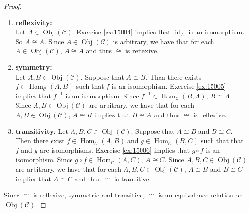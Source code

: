 \documentclass[12pt]{amsart}
\theoremstyle{definition}
\newcommand{\MC}{\mathcal{C}}
\DeclareMathOperator{\id}{id}
\DeclareMathOperator{\Obj}{Obj}
\DeclareMathOperator{\Hom}{Hom}
\DeclareMathOperator*{\0}{\mbf{0}}
\DeclareMathOperator*{\1}{\mbf{1}}
\newcommand{\rex}[1]{Exercise \ref{ex:#1}}
\begin{document}
	\begin{proof} \
		\begin{enumerate}
			\item \textbf{reflexivity: } \\
			Let $A \in \Obj(\MC)$. \rex{15004} implies that $\id_A$ is an isomorphism. So $A \cong A$. Since $A \in \Obj(\MC)$ is arbitrary, we have that for each $A \in \Obj(\MC)$, $A \cong A$ and thus $\cong$ is reflexive. 
			\item \textbf{symmetry: } \\
			Let $A, B \in \Obj(\MC)$. Suppose that $A \cong B$. Then there exists $f \in \Hom_{\MC}(A,B)$ such that $f$ is an isomorphism. \rex{15005} implies that $f^{-1}$ is an isomorphism. Since $f^{-1} \in \Hom_{\MC}(B, A)$, $B \cong A$.  Since $A, B \in \Obj(\MC)$ are arbitrary, we have that for each $A, B \in \Obj(\MC)$, $A \cong B$ implies that $B \cong A$ and thus $\cong$ is reflexive. 
			\item \textbf{transitivity: }
			Let $A, B, C \in \Obj(\MC)$. Suppose that $A \cong B$ and $B \cong C$. Then there exist $f \in \Hom_{\MC}(A,B)$ and $g \in \Hom_{\MC}(B, C)$ such that that $f$ and $g$ are isomorphisms. \rex{15006} implies that $g \circ f$ is an isomorphism. Since $g \circ f \in \Hom_{\MC}(A, C)$, $A \cong C$. Since $A, B, C \in \Obj(\MC)$ are arbitrary, we have that for each $A, B, C \in \Obj(\MC)$, $A \cong B$ and $B \cong C$ implies that $A \cong C$ and thus $\cong$ is transitive. 
		\end{enumerate}
		Since $\cong$ is reflexive, symmetric and transitive, $\cong$ is an equivalence relation on $\Obj(\MC)$.
	\end{proof}
	
\end{document}
